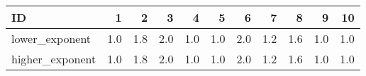 \begin{tabular}{lrrrrrrrrrr}
\toprule
ID & 1 & 2 & 3 & 4 & 5 & 6 & 7 & 8 & 9 & 10 \\
\midrule
lower_exponent & 1.0 & 1.8 & 2.0 & 1.0 & 1.0 & 2.0 & 1.2 & 1.6 & 1.0 & 1.0 \\
higher_exponent & 1.0 & 1.8 & 2.0 & 1.0 & 1.0 & 2.0 & 1.2 & 1.6 & 1.0 & 1.0 \\
\bottomrule
\end{tabular}
